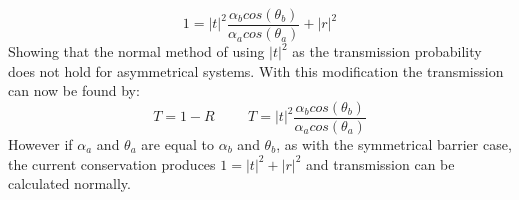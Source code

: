 \documentclass[12pt,a4paper]{article}
\begin{document}
		\begin{equation}
			1=|t|^{2}\frac{\alpha_{b}cos\left(\theta_{b}\right)}{\alpha_{a}cos\left(\theta_{a}\right)}+|r|^{2}
		\end{equation}
		Showing that the normal method of using $|t|^{2}$ as the transmission probability does not hold for asymmetrical systems. With this modification the transmission can now be found by:
		\begin{equation}
			T=1-R
			\hspace{1cm}
			T=|t|^{2}\frac{\alpha_{b}cos\left(\theta_{b}\right)}{\alpha_{a}cos\left(\theta_{a}\right)}
			\label{newT}
		\end{equation}
		However if $\alpha_{a}$ and $\theta_{a}$ are equal to $\alpha_{b}$ and $\theta_{b}$, as with the symmetrical barrier case, the current conservation produces $1=|t|^{2}+|r|^{2}$ and transmission can be calculated normally.
\end{document}
